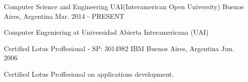 

\begin{cventries}

  \cventry
    {Computer Science and Engineering} %
    {UAI(Interamerican Open University)} %
    {Buenos Aires, Argentina} %
    {Mar. 2014 - PRESENT} %
    {
      \begin{cvitems}
        Computer Engeniering at Universidad Abierta Interamericana (UAI)
      \end{cvitems}
    }

  \cventry
    {Certified Lotus Proffesional - SP: 3014982} %
    {IBM} %
    {Buenos Aires, Argentina} %
    {Jun. 2006} %
    {
      \begin{cvitems}
        Certified Lotus Proffesional on applications development.
      \end{cvitems}
    }

\end{cventries}



